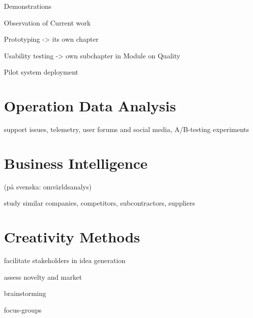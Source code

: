 Demonstrations

Observation of Current work 

Prototyping -> its own chapter 

Usability testing -> own subchapter in Module on Quality

Pilot system deployment


\section{Operation Data Analysis}

support issues, telemetry, user forums and social media, A/B-testing experiments

\section{Business Intelligence}
(på svenska: omvärldsanalys)

study similar companies, competitors, subcontractors, suppliers 

\section{Creativity Methods}

facilitate stakeholders in idea generation 

assess novelty and market 

brainstorming

focus-groups
